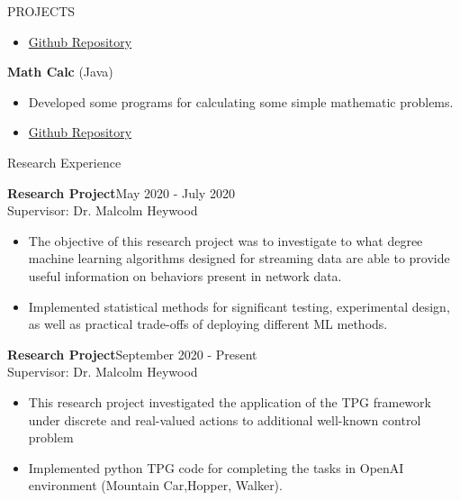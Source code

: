\documentclass{resume} %
\begin{document}
\begin{rSection}{PROJECTS}
\begin{itemize}
    \item \href{https://github.com/AmousQiu/Todo-List}{Github Repository}
\end{itemize}
\vspace{1.25em}
\item \textbf{Math Calc} \hfill(Java)
\begin{itemize}
    \itemsep -3pt {} 
    \item {Developed some programs for calculating some simple mathematic problems.}
    \item \href{https://github.com/AmousQiu/MathCalc}{Github Repository}
\end{itemize}
\end{rSection} 

\begin{rSection}{Research Experience}
\vspace{-1.25em}
\item \textbf{Research Project}\hfill May 2020 - July 2020\\
Supervisor: Dr. Malcolm Heywood

\begin{itemize}
    \itemsep -3pt {} 
    \item The objective of this research project was to investigate to what degree machine learning algorithms designed for streaming data are able to provide useful information on behaviors present in network data.
    \item Implemented statistical methods for significant testing, experimental design, as well as practical trade-offs of deploying different ML methods.
\end{itemize}
\vspace{1.25em}
\item \textbf{Research Project}\hfill September 2020 - Present\\
Supervisor: Dr. Malcolm Heywood

\begin{itemize}
    \itemsep -3pt {} 
    \item This research project investigated the application of the TPG framework under discrete and real-valued actions to additional well-known control problem 
    \item Implemented python TPG code for completing the tasks in OpenAI environment (Mountain Car,Hopper, Walker).
\end{itemize}
\end{rSection}
\end{document}
